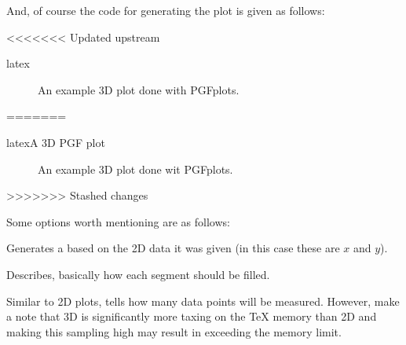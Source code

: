 \documentclass[minted, draw, cover = contour]{../tex/hebdomon}
\begin{document}
And, of course the code for generating the plot is given as follows:

<<<<<<< Updated upstream
\begin{code}{latex}
\begin{figure}[!ht]
  \centering
  \caption{An example 3D plot done with PGFplots.}
\end{figure}
\end{code}
=======
\begin{Code}{latex}{A 3D PGF plot}
	\begin{figure}[!ht]
		\centering
		\caption{An example 3D plot done wit PGFplots.}
	\end{figure}
\end{Code}
>>>>>>> Stashed changes

Some options worth mentioning are as follows:

\begin{hgitemize}
	\item[\pcode{surf}] Generates a  based on the 2D
	data it was given (in this case these are $x$ and $y$).
	\item[\pcode{shader}] Describes, basically how each segment should be
	filled.
	\item[\pcode{samples}] Similar to 2D plots, tells how many data points will
	be measured. However, make a note that 3D is significantly more taxing
	on the TeX memory than 2D and making this sampling high may result in
	exceeding the memory limit.
\end{hgitemize}
\end{document}
